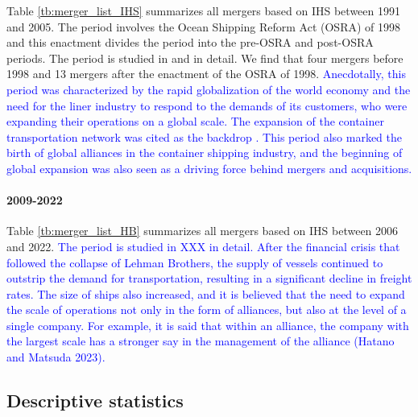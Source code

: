 \documentclass[10pt]{article}
\begin{document}
Table \ref{tb:merger_list_IHS} summarizes all mergers based on IHS between 1991 and 2005.
The period involves the Ocean Shipping Reform Act (OSRA) of 1998 and this enactment divides the period into the pre-OSRA and post-OSRA periods. 
The period is studied in \cite{fusillo2006some,fusillo2013stability} and \cite{reitzes2002rolling} in detail.
We find that four mergers before 1998 and 13 mergers after the enactment of the OSRA of 1998.
\textcolor{blue}{Anecdotally, this period was characterized by the rapid globalization of the world economy and the need for the liner industry to respond to the demands of its customers, who were expanding their operations on a global scale. The expansion of the container transportation network was cited as the backdrop \citep{Hirata2017}. This period also marked the birth of global alliances in the container shipping industry, and the beginning of global expansion was also seen as a driving force behind mergers and acquisitions.}




\paragraph{2009-2022}

Table \ref{tb:merger_list_HB} summarizes all mergers based on IHS between 2006 and 2022.
\textcolor{blue}{The period is studied in XXX in detail. After the financial crisis that followed the collapse of Lehman Brothers, the supply of vessels continued to outstrip the demand for transportation, resulting in a significant decline in freight rates. The size of ships also increased, and it is believed that the need to expand the scale of operations not only in the form of alliances, but also at the level of a single company. For example, it is said that within an alliance, the company with the largest scale has a stronger say in the management of the alliance (Hatano and Matsuda 2023).}





\subsection{Descriptive statistics}\label{sec:descriptive_statistics}
\end{document}
